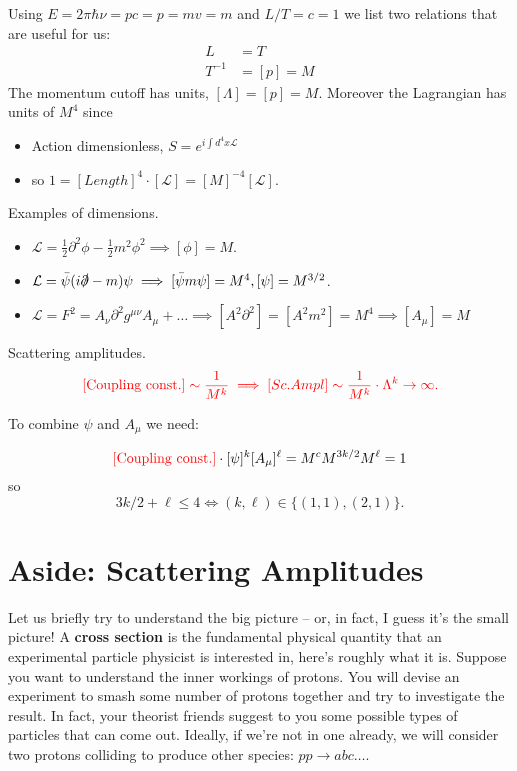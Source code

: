 \documentclass{report}
\theoremstyle{plain}
\theoremstyle{definition}
\theoremstyle{remark}
\newcommand{\FR}[2]{\frac{#1}{#2}}
\newcommand{\mc}{\mathcal}
\newcommand{\di}{\partial}
\newcommand{\colr}[1]{ {\color{red} #1 } }
\begin{document}
Using $E = 2\pi\hbar \nu = pc = p = mv = m$ and $L/T = c = 1$ we list two
relations that are useful for us:
\begin{align*}
    L &= T\\
    T^{-1} &= [p] = M
\end{align*}
The momentum cutoff has units, $[\Lambda]=[p]=M$. Moreover the Lagrangian
has units of $M^4$ since
\begin{itemize}
    \item Action dimensionless, $S = e^{i\int d^4x \mc L}$
    \item so $1 = [Length]^4\cdot [\mc L] = [M]^{-4}[\mc L]$.
\end{itemize}
Examples of dimensions. 
\begin{itemize}
    \item 
$\mc L = \FR{1}{2}\di^2\phi - \FR{1}{2}m^2\phi^2 \implies [\phi] = M$.
    \item 
$\mc L = \bar\psi(i\slashed\partial-m)\psi \implies [\bar\psi m \psi] =
M^4, [\psi] = M^{3/2}$.
    \item
$\mc L = F^2 = A_\nu\di^2g^{\mu\nu}A_\mu + \dots \implies
[A^2\di^2] = [A^2m^2] = M^4 \implies [A_\mu]=M$
\end{itemize}
Scattering amplitudes.
\[\colr{[\textrm{Coupling const.}] \sim \FR{1}{M^k}\implies [Sc. Ampl] \sim \FR{1}{M^k}\cdot
\Lambda^k\to\infty.}\]

To combine $\psi$ and $A_\mu$ we need: 

\[\colr{[\textrm{Coupling const.}]}\cdot [\psi]^k [A_\mu]^\ell =
M^cM^{3k/2} M^\ell=1\]
so
\[ 3k/2+\ell \le 4 \iff (k,\ell)\in\{ (1,1), (2,1) \}.\]


\section{Aside: Scattering Amplitudes}
Let us briefly try to understand the big picture -- or, in fact, I guess it's the
small picture! A \textbf{cross section} is the fundamental physical
quantity that an experimental particle physicist is interested in, here's
roughly what it is. Suppose you want to understand the inner workings of
protons. You will devise an experiment to smash some number of protons
together and try to investigate the result. In fact, your theorist friends
suggest to you some possible types of particles that can come out.
Ideally, if we're not in one already, we will consider two protons
colliding to produce other species: $pp \to abc\ldots$.
\end{document}

